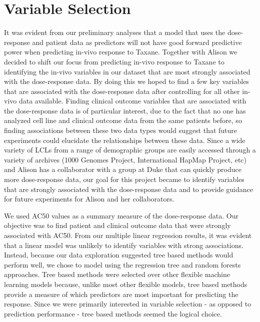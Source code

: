 \documentclass[12pt]{article}
\begin{document}
\section{Variable Selection}
It was evident from our preliminary analyses that a model that uses the dose-response and patient data as predictors will not have good forward predictive power when predicting in-vivo response to Taxane. Together with Alison we decided to shift our focus from predicting in-vivo response to Taxane to identifying the in-vivo variables in our dataset that are most strongly associated with the dose-response data.  By doing this we hoped to find a few key variables that are associated with the dose-response data after controlling for all other in-vivo data available.  Finding clinical outcome variables that are associated with the dose-response data is of particular interest, due to the fact that no one has analyzed cell line and clinical outcome data from the same patients before, so finding associations between these two data types would suggest that future experiments could elucidate the relationships between these data.  Since a wide variety of LCLs from a range of demographic groups are easily accessed through a variety of archives (1000 Genomes Project, International HapMap Project, etc) and Alison has a collaborator with a group at Duke that can quickly produce more dose-response data, our goal for this project became to identify variables that are strongly associated with the dose-response data and to provide guidance for future experiments for Alison and her collaborators.

We used AC50 values as a summary measure of the dose-response data.  Our objective was to find patient and clinical outcome data that were strongly associated with AC50.  From our multiple linear regression results, it was evident that a linear model was unlikely to identify variables with strong associations.  Instead, because our data exploration suggested tree based methods would perform well, we chose to model using the regression tree and random forests approaches.  Tree based methods were selected over other flexible machine learning models because, unlike most other flexible models, tree based methods provide a measure of which predictors are most important for predicting the response.  Since we were primarily interested in variable selection - as opposed to prediction performance - tree based methods seemed the logical choice.  
\end{document}
